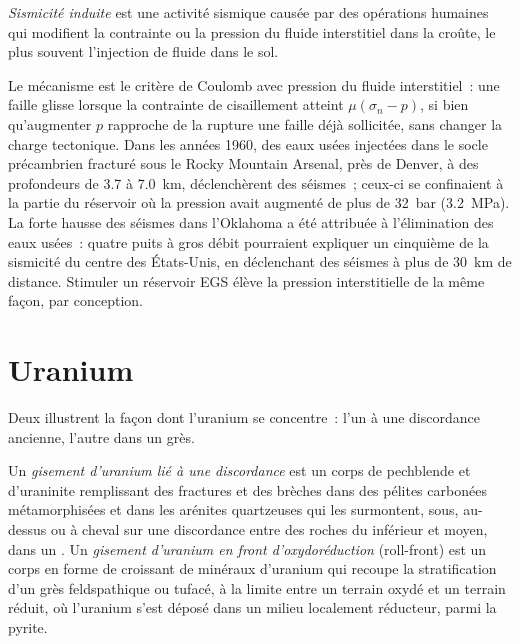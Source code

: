 \begin{definition}\label{def:b2:energy-geology:induced}
\emph{Sismicité induite} est une activité sismique causée par des opérations humaines qui modifient la contrainte
ou la pression du fluide interstitiel dans la croûte, le plus souvent
l'injection de fluide dans le sol.
\end{definition}

Le mécanisme est le critère de Coulomb avec pression du fluide interstitiel~: une faille glisse lorsque la contrainte
de cisaillement atteint $\mu(\sigma_n - p)$, si bien qu'augmenter $p$ rapproche de la rupture une faille déjà sollicitée,
sans changer la charge tectonique. Dans les années 1960, des eaux usées injectées dans le socle précambrien fracturé
sous le Rocky Mountain Arsenal, près de Denver, à des profondeurs de 3.7 à
\qty{7.0}{km}, déclenchèrent des séismes~; ceux-ci se confinaient à la partie du réservoir où la
pression avait augmenté de plus de \qty{32}{bar} (\qty{3.2}{MPa}). La forte hausse des séismes
dans l'Oklahoma a été attribuée à l'élimination des eaux usées~: quatre puits à gros débit pourraient expliquer
un cinquième de la sismicité du centre des États-Unis, en déclenchant des séismes à plus de \qty{30}{km} de distance.
Stimuler un réservoir EGS élève la pression
interstitielle de la même façon, par conception.

\section{Uranium}\label{sec:b2:energy-geology:uranium}

Deux  illustrent la façon dont l'uranium se concentre~: l'un à une discordance ancienne,
l'autre dans un grès.

\begin{definition}\label{def:b2:energy-geology:uranium}
Un \emph{gisement d'uranium lié à une discordance} est un corps de pechblende et d'uraninite
remplissant des fractures et des brèches dans des pélites carbonées métamorphisées et dans les arénites quartzeuses
qui les surmontent, sous, au-dessus ou à cheval sur une discordance entre des roches du  inférieur et moyen,
dans un . Un \emph{gisement d'uranium en front d'oxydoréduction}
(roll-front) est un corps en forme de croissant de minéraux d'uranium qui recoupe la stratification d'un grès feldspathique
ou tufacé, à la limite entre un terrain oxydé et un terrain réduit, où l'uranium s'est déposé dans un milieu localement
réducteur, parmi la pyrite.
\end{definition}

